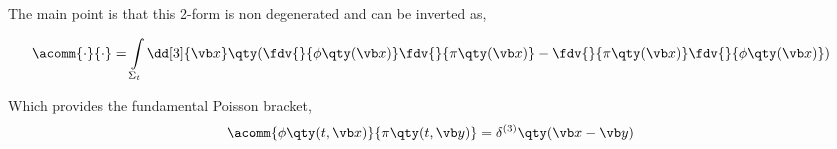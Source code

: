 The main point is that this 2-form is non degenerated and can be inverted as,

\begin{align}
    \acomm{\cdot}{\cdot} &= \int\limits_{\Sigma_t}\dd[3]{\vb x}\qty(\fdv{}{\phi\qty(\vb x)}\fdv{}{\pi\qty(\vb x)}-\fdv{}{\pi\qty(\vb x)}\fdv{}{\phi\qty(\vb x)})
\end{align}

Which provides the fundamental Poisson bracket,
\begin{align}
    \acomm{\phi\qty(t,\vb x)}{\pi\qty(t,\vb y)}&=\delta^{(3)}\qty(\vb x-\vb y) 
\end{align}





